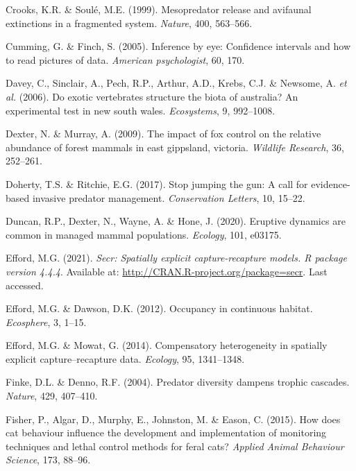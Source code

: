 \documentclass[]{elsarticle} %
\begin{document}
\leavevmode\hypertarget{ref-crooks1999}{}%
Crooks, K.R. \& Soulé, M.E. (1999). Mesopredator release and avifaunal extinctions in a fragmented system. \emph{Nature}, 400, 563--566.

\leavevmode\hypertarget{ref-cumming2005inference}{}%
Cumming, G. \& Finch, S. (2005). Inference by eye: Confidence intervals and how to read pictures of data. \emph{American psychologist}, 60, 170.

\leavevmode\hypertarget{ref-davey2006}{}%
Davey, C., Sinclair, A., Pech, R.P., Arthur, A.D., Krebs, C.J. \& Newsome, A. \emph{et al.} (2006). Do exotic vertebrates structure the biota of australia? An experimental test in new south wales. \emph{Ecosystems}, 9, 992--1008.

\leavevmode\hypertarget{ref-dexter2009impact}{}%
Dexter, N. \& Murray, A. (2009). The impact of fox control on the relative abundance of forest mammals in east gippsland, victoria. \emph{Wildlife Research}, 36, 252--261.

\leavevmode\hypertarget{ref-doherty2017}{}%
Doherty, T.S. \& Ritchie, E.G. (2017). Stop jumping the gun: A call for evidence-based invasive predator management. \emph{Conservation Letters}, 10, 15--22.

\leavevmode\hypertarget{ref-duncan2020eruptive}{}%
Duncan, R.P., Dexter, N., Wayne, A. \& Hone, J. (2020). Eruptive dynamics are common in managed mammal populations. \emph{Ecology}, 101, e03175.

\leavevmode\hypertarget{ref-efford2021secr}{}%
Efford, M.G. (2021). \emph{Secr: Spatially explicit capture-recapture models. R package version 4.4.4}. Available at: \url{http://CRAN.R-project.org/package=secr}. Last accessed.

\leavevmode\hypertarget{ref-efford2012}{}%
Efford, M.G. \& Dawson, D.K. (2012). Occupancy in continuous habitat. \emph{Ecosphere}, 3, 1--15.

\leavevmode\hypertarget{ref-https:ux2fux2fdoi.orgux2f10.1890ux2f13-1497.1}{}%
Efford, M.G. \& Mowat, G. (2014). Compensatory heterogeneity in spatially explicit capture--recapture data. \emph{Ecology}, 95, 1341--1348.

\leavevmode\hypertarget{ref-finke2004}{}%
Finke, D.L. \& Denno, R.F. (2004). Predator diversity dampens trophic cascades. \emph{Nature}, 429, 407--410.

\leavevmode\hypertarget{ref-fisher2015}{}%
Fisher, P., Algar, D., Murphy, E., Johnston, M. \& Eason, C. (2015). How does cat behaviour influence the development and implementation of monitoring techniques and lethal control methods for feral cats? \emph{Applied Animal Behaviour Science}, 173, 88--96.
\end{document}
